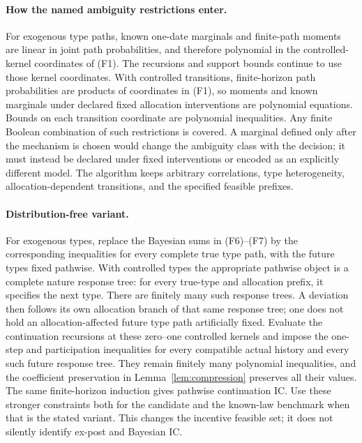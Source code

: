 \documentclass[11pt,a4paper]{article}
\begin{document}
\paragraph{How the named ambiguity restrictions enter.}
For exogenous type paths, known one-date marginals and finite-path
moments are linear in joint path probabilities, and therefore polynomial
in the controlled-kernel coordinates of \textup{(F1)}. The recursions
and support bounds continue to use those kernel coordinates. With controlled transitions, finite-horizon path
probabilities are products of coordinates in \textup{(F1)}, so moments
and known marginals under declared fixed allocation interventions are
polynomial equations. Bounds on each transition coordinate are polynomial
inequalities. Any finite Boolean combination of such restrictions is
covered. A marginal defined only after the mechanism is chosen would
change the ambiguity class with the decision; it must instead be declared
under fixed interventions or encoded as an explicitly different model.
The algorithm keeps arbitrary correlations, type heterogeneity,
allocation-dependent transitions, and the specified feasible prefixes.

\paragraph{Distribution-free variant.}
For exogenous types, replace the Bayesian sums in \textup{(F6)--(F7)}
by the corresponding inequalities for every complete true type path,
with the future types fixed pathwise. With controlled types the
appropriate pathwise object is a complete nature response tree: for
every true-type and allocation prefix, it specifies the next type.
There are finitely many such response trees. A deviation then follows
its own allocation branch of that same response tree; one does not
hold an allocation-affected future type path artificially fixed.
Evaluate the continuation recursions at these zero--one controlled
kernels and impose the one-step and participation inequalities for
every compatible actual history and every such future response tree.
They remain finitely many polynomial inequalities, and the coefficient
preservation in Lemma~\ref{lem:compression} preserves all their values.
The same finite-horizon induction gives pathwise continuation IC.
Use these stronger constraints both for the candidate and the
known-law benchmark when that is the stated variant. This changes the
incentive feasible set; it does not silently identify ex-post and
Bayesian IC.
\end{document}
